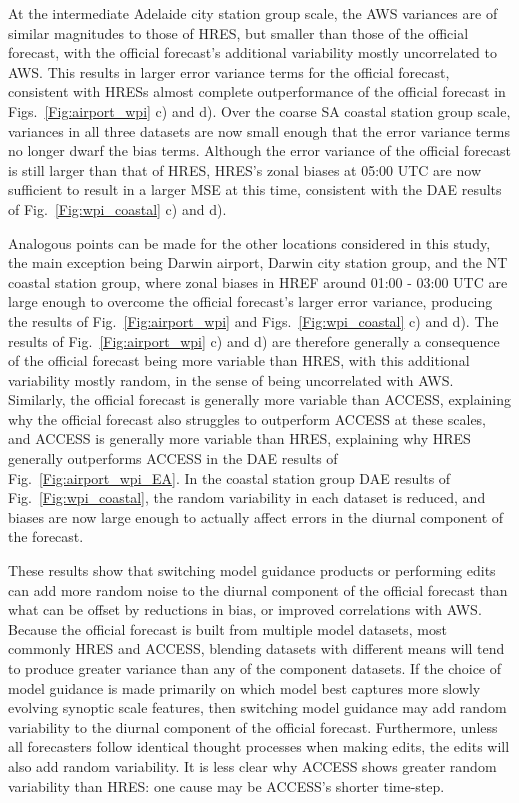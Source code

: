 \documentclass[twocol]{ametsoc}
\begin{document}
At the intermediate Adelaide city station group scale, the AWS variances are of similar magnitudes to those of HRES, but smaller than those of the official forecast, with the official forecast's additional variability mostly uncorrelated to AWS. This results in larger error variance terms for the official forecast, consistent with HRESs almost complete outperformance of the official forecast in Figs.~\ref{Fig:airport_wpi} c) and d). Over the coarse SA coastal station group scale, variances in all three datasets are now small enough that the error variance terms no longer dwarf the bias terms. Although the error variance of the official forecast is still larger than that of HRES, HRES's zonal biases at 05:00 UTC are now sufficient to result in a larger MSE at this time, consistent with the DAE results of Fig.~\ref{Fig:wpi_coastal} c) and d). 

Analogous points can be made for the other locations considered in this study, the main exception being Darwin airport, Darwin city station group, and the NT coastal station group, where zonal biases in HREF around 01:00 - 03:00 UTC are large enough to overcome the official forecast's larger error variance, producing the results of Fig.~\ref{Fig:airport_wpi} and Figs.~\ref{Fig:wpi_coastal} c) and d). The results of Fig.~\ref{Fig:airport_wpi} c) and d) are therefore generally a consequence of the official forecast being more variable than HRES, with this additional variability mostly random, in the sense of being uncorrelated with AWS. Similarly, the official forecast is generally more variable than ACCESS, explaining why the official forecast also struggles to outperform ACCESS at these scales, and ACCESS is generally more variable than HRES, explaining why HRES generally outperforms ACCESS in the DAE results of Fig.~\ref{Fig:airport_wpi_EA}. In the coastal station group DAE results of Fig.~\ref{Fig:wpi_coastal}, the random variability in each dataset is reduced, and biases are now large enough to actually affect errors in the diurnal component of the forecast.  

These results show that switching model guidance products or performing edits can add more random noise to the diurnal component of the official forecast than what can be offset by reductions in bias, or improved correlations with AWS. Because the official forecast is built from multiple model datasets, most commonly HRES and ACCESS, blending datasets with different means will tend to produce greater variance than any of the component datasets. If the choice of model guidance is made primarily on which model best captures more slowly evolving synoptic scale features, then switching model guidance may add random variability to the diurnal component of the official forecast. Furthermore, unless all forecasters follow identical thought processes when making edits, the edits will also add random variability. It is less clear why ACCESS shows greater random variability than HRES: one cause may be ACCESS's shorter time-step.  
\end{document}

